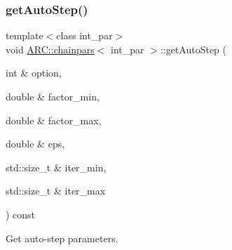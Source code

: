 \subsubsection{\texorpdfstring{get\+Auto\+Step()}{getAutoStep()}}
{\footnotesize\ttfamily template$<$class int\+\_\+par$>$ \\
void \hyperlink{classARC_1_1chainpars}{A\+R\+C\+::chainpars}$<$ int\+\_\+par $>$\+::get\+Auto\+Step (\begin{DoxyParamCaption}\item[{int \&}]{option,  }\item[{double \&}]{factor\+\_\+min,  }\item[{double \&}]{factor\+\_\+max,  }\item[{double \&}]{eps,  }\item[{std\+::size\+\_\+t \&}]{iter\+\_\+min,  }\item[{std\+::size\+\_\+t \&}]{iter\+\_\+max }\end{DoxyParamCaption}) const\hspace{0.3cm}{\ttfamily [inline]}}



Get auto-\/step parameters. 


